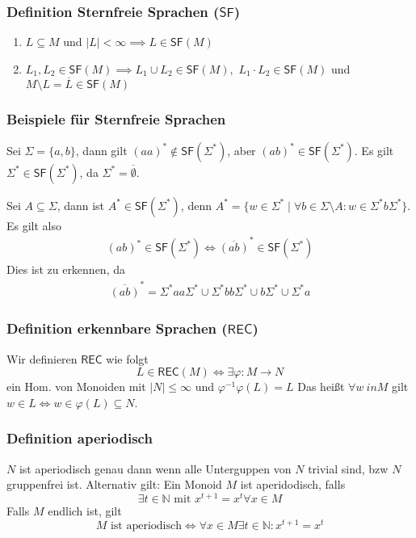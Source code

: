 \documentclass[12pt, german]{article}
\newcommand{\N}{\mathbb{N}}
\newcommand{\sigstern}{\Sigma^\ast}
\newcommand{\inv}{^{-1}}
\newcommand{\rec}{\mathsf{REC}}
\newcommand{\starfree}{\mathsf{SF}}
\begin{document}
	
	\subsubsection{Definition Sternfreie Sprachen ($\starfree$)}
	\begin{enumerate}[label=\arabic*)]
		\item $L \subseteq M $ und $ |L| < \infty \implies L \in \starfree(M)$
		\item $L_1, L_2 \in \starfree(M) \implies L_1 \cup L_2 \in \starfree(M), \, \, L_1 \cdot L_2 \in \starfree(M)$  und $M \setminus L = \overline{L} \in \starfree(M)$\\ 
	\end{enumerate}
	
	\subsubsection{Beispiele für Sternfreie Sprachen}
	Sei $\Sigma = \{a,b\}$, dann gilt $(aa)^\ast \not\in \starfree(\sigstern)$, aber $(ab)^\ast \in \starfree(\sigstern)$. Es gilt $\sigstern \in \starfree(\sigstern)$, da $\sigstern = \overline{\emptyset}$. 
	\newline
	
	Sei $A\subseteq \Sigma$, dann ist $A^\ast \in \starfree(\sigstern)$, denn $A^\ast = \{ w \in \sigstern \mid \forall b \in \Sigma \setminus A : w \in \sigstern b\sigstern\}$. Es gilt also 
	\begin{align*}
		(ab)^\ast \in \starfree(\sigstern) \iff \overline{(ab)}^\ast\in \starfree(\sigstern)
	\end{align*}
	Dies ist zu erkennen, da  
	\begin{align*}
		\overline{(ab)}^\ast = \sigstern aa \sigstern \cup \sigstern bb \sigstern \cup b\sigstern \cup \sigstern a
	\end{align*}
	
	
	
	\subsubsection{Definition erkennbare Sprachen ($\rec$)}
	Wir definieren $\rec$ wie folgt  $$L \in \rec(M) \iff \exists \varphi : M \to N$$ ein Hom. von Monoiden mit $|N| \leq \infty$ und $\varphi\inv\varphi(L) = L$
	Das heißt $\forall w \ in M$ gilt $w\in L \iff w \in \varphi(L) \subseteq N$.
	
	\subsubsection{Definition aperiodisch}
	$N$ ist aperiodisch genau dann wenn alle Unterguppen von $N$ trivial sind, bzw $N$ gruppenfrei ist.
	Alternativ gilt: Ein Monoid $M$	ist aperidodisch, falls $$\exists t \in \N \text{ mit } x^{t+1} = x^t \forall x \in M$$
	Falls $M$ endlich ist, gilt $$M \text{ ist aperiodisch} \iff \forall x \in M \exists t \in \N : x^{t+1} = x^t$$
	
\end{document}
